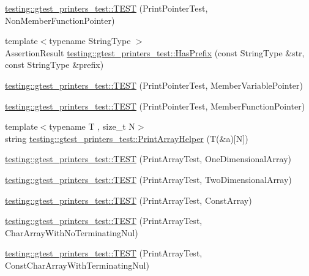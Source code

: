\begin{DoxyCompactItemize}
\item 
\hyperlink{namespacetesting_1_1gtest__printers__test_aa3cb60cf6f3a4a0cd7d9873cd597ffd8}{testing\+::gtest\+\_\+printers\+\_\+test\+::\+T\+E\+ST} (Print\+Pointer\+Test, Non\+Member\+Function\+Pointer)
\item 
{\footnotesize template$<$typename String\+Type $>$ }\\Assertion\+Result \hyperlink{namespacetesting_1_1gtest__printers__test_abbd436200da6c80944c8a7504fb56ea1}{testing\+::gtest\+\_\+printers\+\_\+test\+::\+Has\+Prefix} (const String\+Type \&str, const String\+Type \&prefix)
\item 
\hyperlink{namespacetesting_1_1gtest__printers__test_a434cafcc1dbee409992bbb1593034480}{testing\+::gtest\+\_\+printers\+\_\+test\+::\+T\+E\+ST} (Print\+Pointer\+Test, Member\+Variable\+Pointer)
\item 
\hyperlink{namespacetesting_1_1gtest__printers__test_a9d998b210890d3d7e085d01c457f650f}{testing\+::gtest\+\_\+printers\+\_\+test\+::\+T\+E\+ST} (Print\+Pointer\+Test, Member\+Function\+Pointer)
\item 
{\footnotesize template$<$typename T , size\+\_\+t N$>$ }\\string \hyperlink{namespacetesting_1_1gtest__printers__test_a10300ded1e327c98c6a36beb7ad49e58}{testing\+::gtest\+\_\+printers\+\_\+test\+::\+Print\+Array\+Helper} (T(\&a)\mbox{[}N\mbox{]})
\item 
\hyperlink{namespacetesting_1_1gtest__printers__test_a3845c4717b03cb5ad309c7d9a37acb0a}{testing\+::gtest\+\_\+printers\+\_\+test\+::\+T\+E\+ST} (Print\+Array\+Test, One\+Dimensional\+Array)
\item 
\hyperlink{namespacetesting_1_1gtest__printers__test_ac366b9ec749b2499d21583d3b8f86273}{testing\+::gtest\+\_\+printers\+\_\+test\+::\+T\+E\+ST} (Print\+Array\+Test, Two\+Dimensional\+Array)
\item 
\hyperlink{namespacetesting_1_1gtest__printers__test_a8b5638f178c12f58707ca0f02a3b4d41}{testing\+::gtest\+\_\+printers\+\_\+test\+::\+T\+E\+ST} (Print\+Array\+Test, Const\+Array)
\item 
\hyperlink{namespacetesting_1_1gtest__printers__test_a3bae023a42049745b49fa1f2db9a0cb2}{testing\+::gtest\+\_\+printers\+\_\+test\+::\+T\+E\+ST} (Print\+Array\+Test, Char\+Array\+With\+No\+Terminating\+Nul)
\item 
\hyperlink{namespacetesting_1_1gtest__printers__test_ab51b9ecaca7d635326101b23d5e8afd2}{testing\+::gtest\+\_\+printers\+\_\+test\+::\+T\+E\+ST} (Print\+Array\+Test, Const\+Char\+Array\+With\+Terminating\+Nul)

\end{DoxyCompactItemize}
